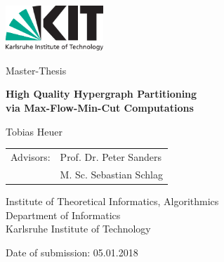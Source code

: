 \documentclass[12pt,a4paper,twoside, enabledeprecatedfontcommands]{scrartcl}
\numberwithin{equation}{section}
\begin{document}

\pagestyle{empty} %

\begin{titlepage}

  \begin{center}\large
 
    \quad\includegraphics[height=17mm]{../img/logo/kit_logo_en.pdf} \hfill

    \vfill

    Master-Thesis
    \vspace*{2cm}

    {\textbf{\huge High Quality Hypergraph Partitioning \\ via Max-Flow-Min-Cut Computations} \par}

    \vfill

    Tobias Heuer

    \vspace*{45mm}

    \begin{tabular}{rl}
      Advisors: & Prof. Dr. Peter Sanders \\
      & M. Sc. Sebastian Schlag\\
    \end{tabular}
    
    \vspace*{10mm}


    Institute of Theoretical Informatics, Algorithmics \\
    Department of Informatics \\
    Karlsruhe Institute of Technology

    \vspace*{15mm}

    Date of submission: 05.01.2018

    \vspace*{12mm}
  \end{center}

\end{titlepage}
\end{document}
